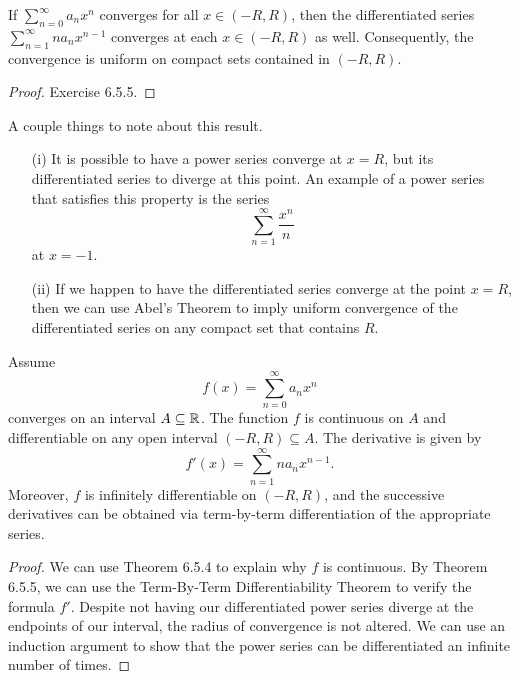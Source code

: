 \begin{theorem}
    If \( \sum_{ n=0  }^{  \infty  } a_n x^n  \) converges for all \( x \in (-R , R ) \), then the differentiated series \( \sum_{ n=1  }^{  \infty  } na_n x^{n-1} \) converges at each \( x \in (-R , R ) \) as well. Consequently, the convergence is uniform on compact sets contained in \( (-R , R ) \).
\end{theorem}

\begin{proof}
Exercise 6.5.5.
\end{proof}

A couple things to note about this result.
\begin{enumerate}
    \item[(i)] It is possible to have a power series converge at \( x =R  \), but its differentiated series to diverge at this point. An example of a power series that satisfies this property is the series 
        \[  \sum_{ n=1  }^{  \infty  } \frac{ x^n  }{ n } \]
        at \( x = -1  \). 
    \item[(ii)] If we happen to have the differentiated series converge at the point \( x = R  \), then we can use Abel's Theorem to imply uniform convergence of the differentiated series on any compact set that contains \( R  \).
\end{enumerate}

\begin{theorem}
Assume 
\[  f(x) = \sum_{ n=0 }^{ \infty  } a_n x^n  \] converges on an interval \( A \subseteq \mathbb{R}  \). The function \( f  \) is continuous on \( A  \) and differentiable on any open interval \( (-R , R ) \subseteq A \). The derivative is given by 
\[  f'(x) = \sum_{ n=1  }^{  \infty  } n a_n x^{n-1}. \]
Moreover, \( f  \) is infinitely differentiable on \( (-R ,R ) \), and the successive derivatives can be obtained via term-by-term differentiation of the appropriate series.
\end{theorem}

\begin{proof}
We can use Theorem 6.5.4 to explain why \( f  \) is continuous. By Theorem 6.5.5, we can use the Term-By-Term Differentiability Theorem to verify the formula \( f' \). Despite not having our differentiated power series diverge at the endpoints of our interval, the radius of convergence is not altered. We can use an induction argument to show that the power series can be differentiated an infinite number of times.
\end{proof}

